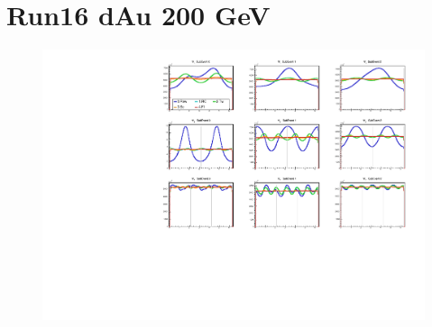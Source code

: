 \documentclass{article}
\begin{document}
\section{Run16 dAu 200 GeV}
\begin{figure}
\includegraphics[width=\textwidth]{fig_eventplane/BBC123.pdf}
\end{figure}

{}

\end{document}
